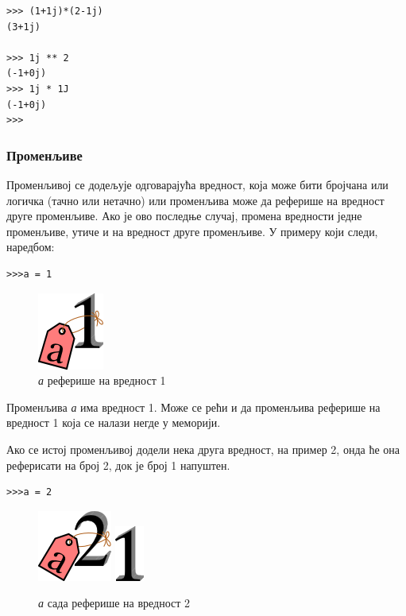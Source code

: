\begin{lstlisting}[caption = Операције са комплексним бројевима, label = kompleksni]
>>> (1+1j)*(2-1j)
(3+1j)

>>> 1j ** 2
(-1+0j)
>>> 1j * 1J
(-1+0j)
>>>
\end{lstlisting}

\subsubsection{Променљиве}

Променљивој се додељује одговарајућа вредност, која може бити бројчана или логичка (тачно или нетачно) или променљива може да реферише на вредност друге променљиве. Ако је ово последње случај, промена вредности једне променљиве, утиче и на вредност друге променљиве. У примеру који следи, наредбом:

\begin{lstlisting}
>>>a = 1
\end{lstlisting}

\begin{figure}[here]
\centering
\includegraphics{1a.png}
\caption{\emph{а} реферише на вредност 1}
\label{slike:a_je_1}
\end{figure}

Променљива \emph{а} има вредност 1. Може се рећи и да променљива реферише на вредност 1 која се налази негде у меморији.

Ако се истој променљивој додели нека друга вредност, на пример 2, онда ће она реферисати на број 2, док је број 1 напуштен.

\begin{lstlisting}
>>>a = 2
\end{lstlisting}

\begin{figure}[here]
\centering
\includegraphics{2a.png}
\includegraphics{1.png}
\caption{\emph{а} сада реферише на вредност 2}
\label{slike:a_je_2}
\end{figure}

